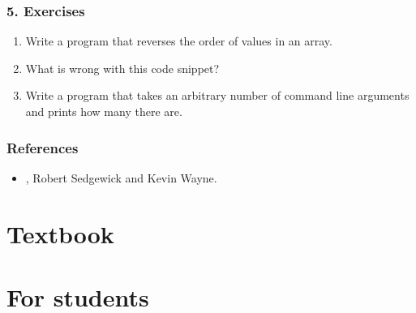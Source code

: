 \documentclass[letterpaper,10pt,english,openany,oneside]{sphinxmanual}
\begin{document}
\subsection{5. Exercises}
\label{\detokenize{arrays-arraylists:exercises}}\begin{enumerate}
\def\theenumi{\arabic{enumi}}
\def\labelenumi{\theenumi .}
\makeatletter\def\p@enumii{\p@enumi \theenumi .}\makeatother
\item {} 
Write a program that reverses the order of values in an array.

\item {} 
What is wrong with this code snippet?
\begin{quote}

\begin{sphinxVerbatim}[commandchars=\\\{\}]
\PYG{p}{[}\PYG{p}{]} 
         
    \PYG{p}{[}\PYG{p}{]}  
\end{sphinxVerbatim}
\end{quote}

\item {} 
Write a program  that takes an arbitrary number of command line arguments and prints how many there are.

\end{enumerate}


\subsection{References}
\label{\detokenize{arrays-arraylists:references}}\begin{itemize}
\item {} 
, Robert Sedgewick and Kevin Wayne.

\end{itemize}


\chapter{Textbook}
\label{\detokenize{index:textbook}}

\chapter{For students}
\label{\detokenize{index:for-students}}
\end{document}

